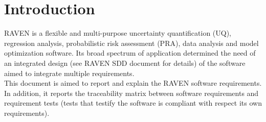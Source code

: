 \section{Introduction}
RAVEN is a flexible and multi-purpose uncertainty quantification (UQ), regression analysis, probabilistic risk assessment 
(PRA), data analysis and model optimization software.  
Its broad spectrum of application determined the need of an integrated design (see RAVEN SDD document for  details)
of the software aimed to integrate multiple requirements.
\\This document is aimed to report and explain the RAVEN software requirements. In addition, it reports the traceability matrix between software requirements and requirement tests (tests that testify the software is compliant
with respect its own requirements).
